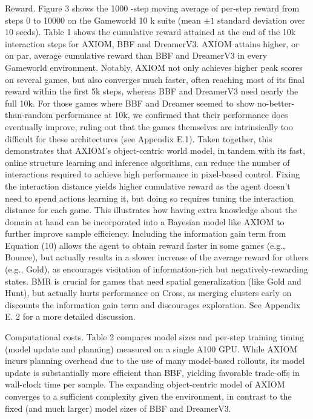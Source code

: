 \documentclass[10pt]{article}
\begin{document}
Reward. Figure 3 shows the 1000 -step moving average of per-step reward from steps 0 to 10000 on the Gameworld 10 k suite (mean $\pm 1$ standard deviation over 10 seeds). Table 1 shows the cumulative reward attained at the end of the 10k interaction steps for AXIOM, BBF and DreamerV3. AXIOM attains higher, or on par, average cumulative reward than BBF and DreamerV3 in every Gameworld environment. Notably, AXIOM not only achieves higher peak scores on several games, but also converges much faster, often reaching most of its final reward within the first 5k steps, whereas BBF and DreamerV3 need nearly the full 10k. For those games where BBF and Dreamer seemed to show no-better-than-random performance at 10k, we confirmed that their performance does eventually improve, ruling out that the games themselves are intrinsically too difficult for these architectures (see Appendix E.1). Taken together, this demonstrates that AXIOM's object-centric world model, in tandem with its fast, online structure learning and inference algorithms, can reduce the number of interactions required to achieve high performance in pixel-based control. Fixing the interaction distance yields higher cumulative reward as the agent doesn't need to spend actions learning it, but doing so requires tuning the interaction distance for each game. This illustrates how having extra knowledge about the domain at hand can be incorporated into a Bayesian model like AXIOM to further improve sample efficiency. Including the information gain term from Equation (10) allows the agent to obtain reward faster in some games (e.g., Bounce), but actually results in a slower increase of the average reward for others (e.g., Gold), as encourages visitation of information-rich but negatively-rewarding states. BMR is crucial for games that need spatial generalization (like Gold and Hunt), but actually hurts performance on Cross, as merging clusters early on discounts the information gain term and discourages exploration. See Appendix E. 2 for a more detailed discussion.

Computational costs. Table 2 compares model sizes and per-step training timing (model update and planning) measured on a single A100 GPU. While AXIOM incurs planning overhead due to the use of many model-based rollouts, its model update is substantially more efficient than BBF, yielding favorable trade-offs in wall-clock time per sample. The expanding object-centric model of AXIOM converges to a sufficient complexity given the environment, in contrast to the fixed (and much larger) model sizes of BBF and DreamerV3.
\end{document}
